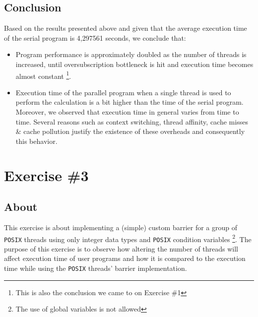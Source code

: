 \documentclass{article}
\begin{document}
\pagebreak

\subsection{Conclusion}
Based on the results presented above and given that the average execution time of the serial
program is 4,297561 seconds, we conclude that:

\begin{itemize}
 \item Program performance is approximately doubled as the number of threads is increased, until
       oversubscription bottleneck is hit and execution time becomes almost constant
       \footnote{This is also the conclusion we came to on Exercise \#1}.
 \item Execution time of the parallel program when a single thread is used to perform the
       calculation is a bit higher than the time of the serial program. Moreover, we observed
       that execution time in general varies from time to time. Several reasons such as context
       switching, thread affinity, cache misses \& cache pollution justify the existence of
       these overheads and consequently this behavior.
\end{itemize}


\section{Exercise \#3}

\subsection{About}
This exercise is about implementing a (simple) custom barrier for a group of \texttt{POSIX}
threads using only integer data types and \texttt{POSIX} condition variables \footnote{The 
use of global variables is not allowed}. The purpose of this exercise is to observe how
altering the number of threads will affect execution time of user programs and how it is
compared to the execution time while using the \texttt{POSIX} threads' barrier implementation.
\end{document}

